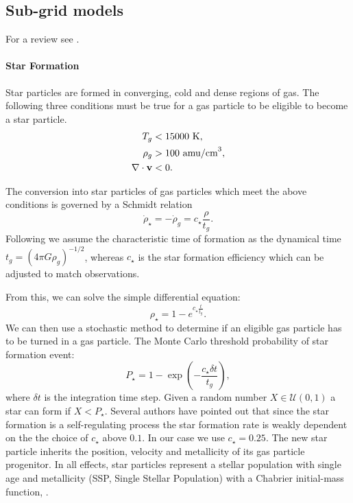 \subsection{Sub-grid models}
For a review see \citet{Verbeke2017, Vandenbroucke2016}.

\paragraph{Star Formation}
\label{sec:star_formation}
Star particles are formed in converging, cold and dense regions of gas.
The following three conditions must be true for a gas particle to be eligible to become a star particle.
\begin{align*}
 T_g &< 15000 \text{~K},\\
 \rho_g &> 100 \text{~amu/cm}^{3},\\
 \nabla \cdot \boldsymbol{\mathbf{v}} & < 0.
\end{align*}

The conversion into star particles of gas particles which meet the above conditions is governed by a Schmidt relation \citep{Schmidt1959}
\begin{equation}                                                                              
\dot{\rho}_\star = -\dot{\rho}_g = c_\star \frac{\rho}{t_g}.
\label{eq:schmidt_relation}
\end{equation}
Following \citep{Stinson2006} we assume the characteristic time of formation as the dynamical time $t_g = (4 \pi G \rho_g)^{-1/2}$, whereas $c_\star$ is the star formation efficiency which can be adjusted to match observations.

From this, we can solve the simple differential equation: 
\begin{equation}
\rho_\star = 1 - e^{c_\star \frac{t}{t_g}}.
\end{equation}
We can then use a stochastic method to determine if an eligible gas particle has to be turned in a gas particle.
The Monte Carlo threshold probability of star formation event:
\begin{equation}
P_\star = 1-\exp(-\frac{c_\star \delta t}{t_g}),
\end{equation}
where $\delta t$ is the integration time step.
Given a random number $X \in \mathcal{U}(0,1)$ a star can form if $X < P_\star$.
Several authors \citep{Stinson2006, Revaz2009, Cloet-Osselaer2012} have pointed out that since the star formation is a self-regulating process the star formation rate is weakly dependent on the the choice of $c_\star$ above $0.1$. In our case we use $c_\star = 0.25$.
The new star particle inherits the position, velocity and metallicity of its gas particle progenitor.
In all effects, star particles represent a stellar population with single age and metallicity (SSP, Single Stellar Population) with a Chabrier initial-mass function, \citet{Chabrier2003}.

